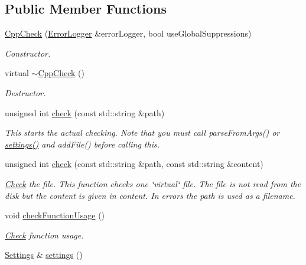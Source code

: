 \subsection*{Public Member Functions}
\begin{DoxyCompactItemize}
\item 
\hyperlink{class_cpp_check_a1f1c8708f750b9fdd491bfbd114daf2e}{Cpp\-Check} (\hyperlink{class_error_logger}{Error\-Logger} \&error\-Logger, bool use\-Global\-Suppressions)
\begin{DoxyCompactList}\small\item\em Constructor. \end{DoxyCompactList}\item 
virtual \hyperlink{class_cpp_check_a8a82788b37adfcf50c0a63c635816dce}{$\sim$\-Cpp\-Check} ()
\begin{DoxyCompactList}\small\item\em Destructor. \end{DoxyCompactList}\item 
unsigned int \hyperlink{class_cpp_check_abc81dee40c7f0c5f5ef353c2e4e46729}{check} (const std\-::string \&path)
\begin{DoxyCompactList}\small\item\em This starts the actual checking. Note that you must call parse\-From\-Args() or \hyperlink{class_cpp_check_a2bf1446c65d47ea68a86ddd34659216d}{settings()} and add\-File() before calling this. \end{DoxyCompactList}\item 
unsigned int \hyperlink{class_cpp_check_aeb20db74cf77fb492c2ac844fc0fe076}{check} (const std\-::string \&path, const std\-::string \&content)
\begin{DoxyCompactList}\small\item\em \hyperlink{class_check}{Check} the file. This function checks one \char`\"{}virtual\char`\"{} file. The file is not read from the disk but the content is given in {\ttfamily content}. In errors the {\ttfamily path} is used as a filename. \end{DoxyCompactList}\item 
void \hyperlink{class_cpp_check_a37e0ed9c61c737f2ac1dd08cc733573e}{check\-Function\-Usage} ()
\begin{DoxyCompactList}\small\item\em \hyperlink{class_check}{Check} function usage. \end{DoxyCompactList}\item 
\hyperlink{class_settings}{Settings} \& \hyperlink{class_cpp_check_a2bf1446c65d47ea68a86ddd34659216d}{settings} ()

\end{DoxyCompactItemize}
